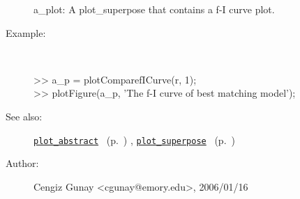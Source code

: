 \begin{description}
	a\_plot: A plot\_superpose that contains a f-I curve plot.
%
\item[Example:]~
\begin{lyxcode} >> a\_p = plotComparefICurve(r, 1);
\\%
 >> plotFigure(a\_p, 'The f-I curve of best matching model');
\\%
\end{lyxcode}
%
\item[See also:]%
\hyperlink{ref_plot_abstract}{\texttt{plot\_abstract}}%
\ (p.~\pageref{ref_plot_abstract})%
%
, \hyperlink{ref_plot_superpose}{\texttt{plot\_superpose}}%
\ (p.~\pageref{ref_plot_superpose})%
%
%
\item[Author:]%
Cengiz Gunay <cgunay@emory.edu>, 2006/01/16
%
\end{description}
\methodline%

